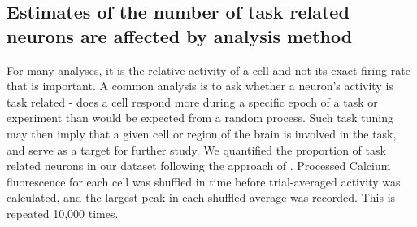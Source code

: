 \documentclass[a4paper,10pt,twocolumn]{article}
\begin{document}



\subsection{Estimates of the number of task related neurons are affected by analysis method}


For many analyses, it is the relative activity of a cell and not its exact firing rate that is important. A common analysis is to ask whether a neuron's activity is task related - does a cell respond more during a specific epoch of a task or experiment than would be expected from a random process. Such task tuning may then imply that a given cell or region of the brain is involved in the task, and serve as a target for further study. We quantified the proportion of task related neurons in our dataset following the approach of \citealt{Peron2015-qz}. Processed Calcium fluorescence for each cell was shuffled in time before trial-averaged activity was calculated, and the largest peak in each shuffled average was recorded. This is repeated 10,000 times. 
\end{document}
